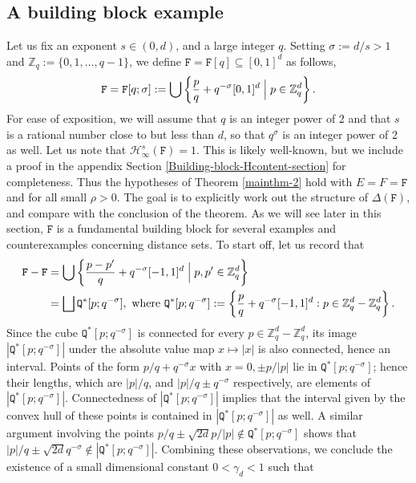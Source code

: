 \documentclass[a4paper,11pt]{amsart}
\numberwithin{equation}{section}
\begin{document}
\subsection{A building block example} \label{building-block-example-section}
Let us fix an exponent $s \in (0, d)$, and a large integer $q$. Setting $\sigma := d/s > 1$ and $\mathbb Z_{q} := \{0, 1, \ldots,  q - 1\}$, we define $\mathtt F = \mathtt F[q] \subseteq [0,1]^d$ as follows, 
\begin{equation} \label{def-building-block-F} 
\mathtt F = \mathtt F[q; \sigma] := \bigcup \left\{\frac{p}{q} + {q}^{-\sigma}[0,1]^d \; \Bigl| \; p \in \mathbb Z_{q}^d \right\}. 
\end{equation}  
For ease of exposition, we will assume that $q$ is an integer power of 2 and that $s$ is a rational number close to but less than $d$, so that $q^{\sigma}$ is an integer power of 2 as well. Let us note that $\mathcal H_{\infty}^{s}(\mathtt F) = 1$. This is likely well-known, but we include a proof in the appendix Section \ref{Building-block-Hcontent-section} for completeness. Thus the hypotheses of Theorem \ref{mainthm-2} hold with $E = F = \mathtt F$ and for all small $\rho > 0$. The goal is to explicitly work out the structure of $\Delta(\mathtt F)$, and compare with the conclusion of the theorem. As we will see later in this section, $\mathtt F$ is a fundamental building block for several examples and counterexamples concerning distance sets. 
\vskip0.1in 
\noindent To start off, let us record that 
\begin{align*} 
\mathtt F - \mathtt F &= \bigcup \left\{\frac{p-p'}{q} + q^{-\sigma}[-1,1]^d \; \Bigl| \; p,p' \in \mathbb Z_{q}^d \right\} \\
&= \bigsqcup \mathtt Q^{\ast}[p; q^{-\sigma}], \text{ where } \mathtt Q^{\ast}[p; q^{-\sigma}] := \left\{\frac{p}{q} +  q^{-\sigma}[-1,1]^d : p \in \mathbb Z_{q}^d - \mathbb Z_{q}^d \right\}.  
\end{align*}
Since the cube $\mathtt Q^{\ast}[p; q^{-\sigma}]$ is connected for every $p \in  \mathbb Z_{q}^d - \mathbb Z_{q}^d$, its image $|\mathtt Q^{\ast}[p; q^{-\sigma}]|$ under the absolute value map $x \mapsto |x|$ is also connected, hence an interval.  Points of the form $p/q + q^{-\sigma} x$ with $x = 0, \pm p/|p|$ lie in $\mathtt Q^{\ast}[p; q^{-\sigma}]$; hence their lengths, which are $|p|/q$, and $|p|/q \pm q^{-\sigma}$ respectively, are elements of $|\mathtt Q^{\ast}[p; q^{-\sigma}]|$. Connectedness of $|\mathtt Q^{\ast}[p; q^{-\sigma}]|$ implies that the interval given by the convex hull of these points is contained in $|\mathtt Q^{\ast}[p; q^{-\sigma}]|$ as well. A similar argument involving the points $p/q \pm \sqrt{2d} p/|p| \notin \mathtt Q^{\ast}[p;q^{-\sigma}]$ shows that $|p|/q \pm \sqrt{2d} q^{-\sigma} \notin |\mathtt Q^{\ast}[p; q^{-\sigma}]|$. Combining these observations, we conclude the existence of a small dimensional constant $0 < \gamma_d < 1$ such that 
\end{document}
